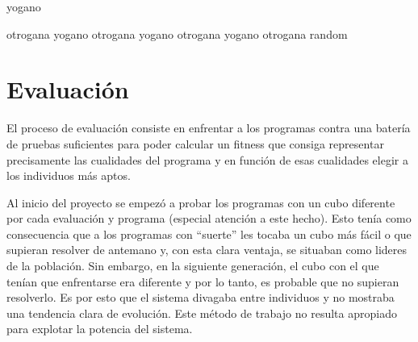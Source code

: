 %

\begin{algorithmic}

				\RETURN yogano
		\ENDIF
		
				\RETURN otrogana
		\ENDIF
				\RETURN yogano
		\ENDIF
				\RETURN otrogana
		\ENDIF
					\RETURN yogano
			\ENDIF
					\RETURN otrogana
			\ENDIF
					\RETURN yogano
			\ENDIF
					\RETURN otrogana
			\ENDIF
		\ELSE 
			\RETURN random 
			
		\ENDIF
\end{algorithmic}



\section{Evaluación}\label{sec:evaluacion}

El proceso de evaluación consiste en enfrentar a los programas contra una batería
de pruebas suficientes para poder calcular un fitness que consiga representar
precisamente las cualidades del programa y en función de esas cualidades elegir a
los individuos más aptos.

Al inicio del proyecto se empezó a probar los programas con un cubo diferente por
cada evaluación y programa (especial atención a este hecho). Esto tenía como
consecuencia que a los programas con “suerte” les tocaba un cubo más fácil o que
supieran resolver de antemano y, con esta clara ventaja, se situaban como lideres
de la población. Sin embargo, en la siguiente generación, el cubo con el que
tenían que enfrentarse era diferente y por lo tanto, es probable que no supieran
resolverlo. Es por esto que el sistema divagaba entre individuos y no mostraba
una tendencia clara de evolución. Este método de trabajo no resulta apropiado
para explotar la potencia del sistema.

